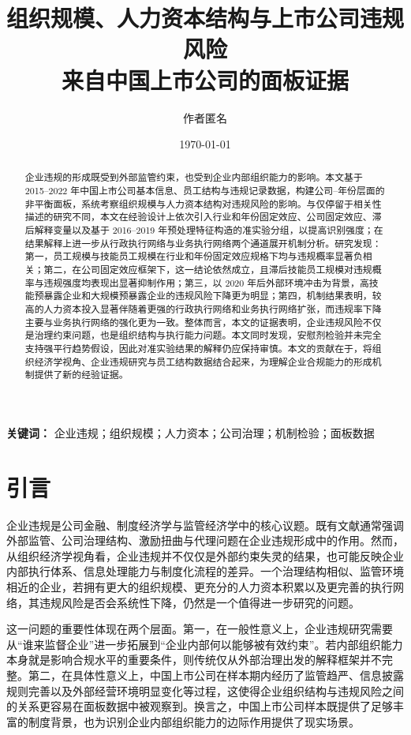 \documentclass[12pt]{ctexart}
\title{组织规模、人力资本结构与上市公司违规风险\\来自中国上市公司的面板证据}
\author{作者匿名}
\date{\today}
\begin{document}
\maketitle

\begin{abstract}
企业违规的形成既受到外部监管约束，也受到企业内部组织能力的影响。本文基于 2015--2022 年中国上市公司基本信息、员工结构与违规记录数据，构建公司--年份层面的非平衡面板，系统考察组织规模与人力资本结构对违规风险的影响。与仅停留于相关性描述的研究不同，本文在经验设计上依次引入行业和年份固定效应、公司固定效应、滞后解释变量以及基于 2016--2019 年预处理特征构造的准实验分组，以提高识别强度；在结果解释上进一步从行政执行网络与业务执行网络两个通道展开机制分析。研究发现：第一，员工规模与技能员工规模在行业和年份固定效应规格下均与违规概率显著负相关；第二，在公司固定效应框架下，这一结论依然成立，且滞后技能员工规模对违规概率与违规强度均表现出显著抑制作用；第三，以 2020 年后外部环境冲击为背景，高技能预暴露企业和大规模预暴露企业的违规风险下降更为明显；第四，机制结果表明，较高的人力资本投入显著伴随着更强的行政执行网络和业务执行网络扩张，而违规率下降主要与业务执行网络的强化更为一致。整体而言，本文的证据表明，企业违规风险不仅是治理约束问题，也是组织结构与执行能力问题。本文同时发现，安慰剂检验并未完全支持强平行趋势假设，因此对准实验结果的解释仍应保持审慎。本文的贡献在于，将组织经济学视角、企业违规研究与员工结构数据结合起来，为理解企业合规能力的形成机制提供了新的经验证据。
\end{abstract}

\noindent\textbf{关键词：} 企业违规；组织规模；人力资本；公司治理；机制检验；面板数据

\section{引言}
企业违规是公司金融、制度经济学与监管经济学中的核心议题。既有文献通常强调外部监管、公司治理结构、激励扭曲与代理问题在企业违规形成中的作用。然而，从组织经济学视角看，企业违规并不仅仅是外部约束失灵的结果，也可能反映企业内部执行体系、信息处理能力与制度化流程的差异。一个治理结构相似、监管环境相近的企业，若拥有更大的组织规模、更充分的人力资本积累以及更完善的执行网络，其违规风险是否会系统性下降，仍然是一个值得进一步研究的问题。

这一问题的重要性体现在两个层面。第一，在一般性意义上，企业违规研究需要从“谁来监督企业”进一步拓展到“企业内部何以能够被有效约束”。若内部组织能力本身就是影响合规水平的重要条件，则传统仅从外部治理出发的解释框架并不完整。第二，在具体性意义上，中国上市公司在样本期内经历了监管趋严、信息披露规则完善以及外部经营环境明显变化等过程，这使得企业组织结构与违规风险之间的关系更容易在面板数据中被观察到。换言之，中国上市公司样本既提供了足够丰富的制度背景，也为识别企业内部组织能力的边际作用提供了现实场景。
\end{document}

